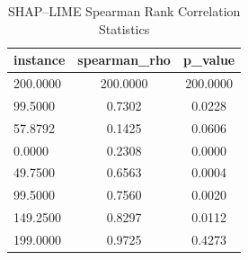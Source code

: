 \begin{table}
\centering
\caption{SHAP–LIME Spearman Rank Correlation Statistics}
\label{tab:agreement}
\begin{tabular}{lcc}
\toprule
instance & spearman_rho & p_value \\
\midrule
200.0000 & 200.0000 & 200.0000 \\
99.5000 & 0.7302 & 0.0228 \\
57.8792 & 0.1425 & 0.0606 \\
0.0000 & 0.2308 & 0.0000 \\
49.7500 & 0.6563 & 0.0004 \\
99.5000 & 0.7560 & 0.0020 \\
149.2500 & 0.8297 & 0.0112 \\
199.0000 & 0.9725 & 0.4273 \\
\bottomrule
\end{tabular}
\end{table}
